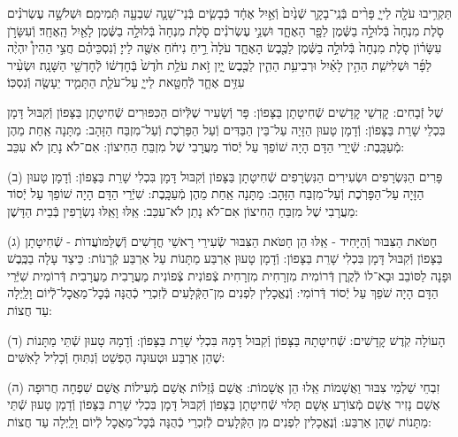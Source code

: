 \documentclass[twoside, openany, parskip=half, 11pt]{book}
\begin{document}
תַּקְרִ֥יבוּ עֹלָ֖ה לַייָ֑ פָּרִ֨ים בְּֿנֵֽי־בָקָ֤ר שְֿׁנַ֙יִם֙ וְֿאַ֣יִל אֶחָ֔ד כְּֿבָשִׂ֧ים בְּֿנֵי־שָׁנָ֛ה שִׁבְעָ֖ה תְּֿמִימִֽם׃
וּשְׁלֹשָׁ֣ה עֶשְׂרֹנִ֗ים סֹ֤לֶת מִנְחָה֙ בְּֿלוּלָ֣ה בַשֶּׁ֔מֶן לַפָּ֖ר הָאֶחָ֑ד וּשְׁנֵ֣י עֶשְׂרֹנִ֗ים סֹ֤לֶת מִנְחָה֙ בְּֿלוּלָ֣ה בַשֶּׁ֔מֶן לָאַ֖יִל הָֽאֶחָֽד׃
וְֿעִשָּׂרֹ֣ן עִשָּׂר֗וֹן סֹ֤לֶת מִנְחָה֙ בְּֿלוּלָ֣ה בַשֶּׁ֔מֶן לַכֶּ֖בֶשׂ הָאֶחָ֑ד עֹלָה֙ רֵ֣יחַ נִיחֹ֔חַ אִשֶּׁ֖ה לַייָ׃
וְֿנִסְכֵּיהֶ֗ם חֲצִ֣י הַהִין֩ יִהְיֶ֨ה לַפָּ֜ר וּשְׁלִישִׁ֧ת הַהִ֣ין לָאַ֗יִל וּרְבִיעִ֥ת הַהִ֛ין לַכֶּ֖בֶשׂ יָ֑יִן זֹ֣את עֹלַ֥ת חֹ֙דֶשׁ֙ בְּֿחׇדְשׁ֔וֹ לְֿחׇדְשֵׁ֖י הַשָּׁנָֽה׃
וּשְׂעִ֨יר עִזִּ֥ים אֶחָ֛ד לְֿחַטָּ֖את לַייָ֑ עַל־עֹלַ֧ת הַתָּמִ֛יד יֵעָשֶׂ֖ה וְֿנִסְכּֽוֹ׃

%
שֶׁל זְֿבָחִים: קׇדְשֵׁי קׇדָשִׁים שְֿׁחִיטָתָן בַּצָּפוֹן: פָּר וְֿשָׂעִיר שֶׁלְּֿיוֹם הַכִּפּוּרִים שְֿׁחִיטָתָן בַּצָּפוֹן וְֿקִבּוּל דָּמָן בִּכְלֵי שָׁרֵת בַּצָּפוֹן: וְֿדָמָן טָעוּן הַזָּיָה עַל־בֵּין הַבַּדִּים וְֿעַל הַפָּרֹֽכֶת וְֿעַל־מִזְבַּח הַזָּהָב: מַתָּנָה אַֽחַת מֵהֶן מְֿעַכָּֽבֶת: שְֿׁיָרֵי הַדָּם הָיָה שׁוֹפֵךְ עַל יְֿסוֹד מַעֲרָבִי שֶׁל מִזְבֵּחַ הַחִיצוֹן: אִם־לֹא נָתַן לֹא עִכֵּב:

(ב) פָּרִים הַנִּשְׂרָפִים וּשְׂעִירִים הַנִּשְׂרָפִים שְֿׁחִיטָתָן בַּצָּפוֹן וְֿקִבּוּל דָּמָן בִּכְלִי שָׁרֵת בַּצָּפוֹן: וְֿדָמָן טָעוּן הַזָּיָה עַל־הַפָּרֹֽכֶת וְֿעַל־מִזְבַּח הַזָּהָב: מַתָּנָה אַֽחַת מֵהֶן מְֿעַכָּֽבֶת: שִׁיְֿרֵי הַדָּם הָיָה שׁוֹפֵךְ עַל יְֿסוֹד מַעֲרָבִי שֶׁל מִזְבֵּחַ הַחִיצוֹן אִם־לֹא נָתַן לֹא־עִכֵּב: אֵֽלּוּ וָאֵֽלּוּ נִשְׂרָפִין בְּֿבֵית הַדָּשֶׁן:

(ג) חַטֹּאת הַצִּבּוּר וְֿהַיָּחִיד - אֵֽלּוּ הֵן חַטֹּאת הַצִּבּוּר שְֿׂעִירֵי רָאשֵׁי חֳדָשִׁים וְֿשֶׁלַּמּוׁעֲדוׂת - שְֿׁחִיטָתָן בַּצָּפוֹן וְֿקִבּוּל דָּמָן בִּכְלִי שָׁרֵת בַּצָּפוֹן: וְֿדָמָן טָעוּן אַרְבַּע מַתָּנוֹת עַל אַרְבַּע קְֿרָנוֹת: כֵּיצַד עָלָה בַכֶּֽבֶשׁ וּפָנָה לַסּוֹבֵב וּבָא־לוֹ לְֿקֶֽרֶן דְּֿרוֹמִית מִזְרָחִית מִזְרָחִית צְֿפוֹנִית צְֿפוֹנִית מַעֲרָבִית מַעֲרָבִית דְּֿרוֹמִית שִׁיְּֿרֵי הַדָּם הָיָה שֹׁפֵךְ עַל יְֿסוֹד דְּֿרוֹמִי: וְֿנֶאֱכָלִין לִפְנִים מִן־הַקְּֿלָעִים לְֿזִכְרֵי כְֿהֻנָּה בְּֿכׇל־מַאֲכׇל־לְֿיוֹם וָלַֽיְלָה עַד חֲצוֹת:

(ד) הָעוֹלָה קֹֽדֶשׁ קׇדָשִׁים: שְֿׁחִיטָתָהּ בַּצָּפוֹן וְֿקִבּוּל דָּמָהּ בִּכְלִי שָׁרֵת בַּצָּפוֹן: וְֿדָמָהּ טָעוּן שְֿׁתֵּי מַתָּנוֹת שֶׁהֵן אַרְבַּע וּטְעוּנָה הֶפְשֵׁט וְֿנִתּֽוּחַ וְֿכָלִיל לָאִשִּׁים:

(ה) זִבְחֵי שַׁלְמֵי צִבּוּר וַאֲשָׁמוֹת אֵֽלוּ הֵן אֲשָׁמוֹת: אֲשַׁם גְּֿזֵלוֹת אֲשַׁם מְֿעִילוֹת אֲשַׁם שִׁפְחָה חֲרוּפָה אֲשַׁם נָזִיר אֲשַׁם מְֿצוֹרָע אָשָׁם תָּלוּי שְֿׁחִיטָתָן בַּצָּפוֹן וְֿקִבּוּל דָּמָן בִּכְלִי שָׁרֵת בַּצָּפוֹן וְֿדָמָן טָעוּן שְֿׁתֵּי מַתָּנוֹת שֶׁהֵן אַרְבַּע: וְֿנֶאֱכָלִין לִפְנִים מִן הַקְּֿלָעִים לְֿזִכְרֵי כְֿהֻנָּה בְּֿכׇל־מַאֲכׇל לְֿיוֹם וָלַֽיְלָה עַד חֲצוֹת:
\end{document}
